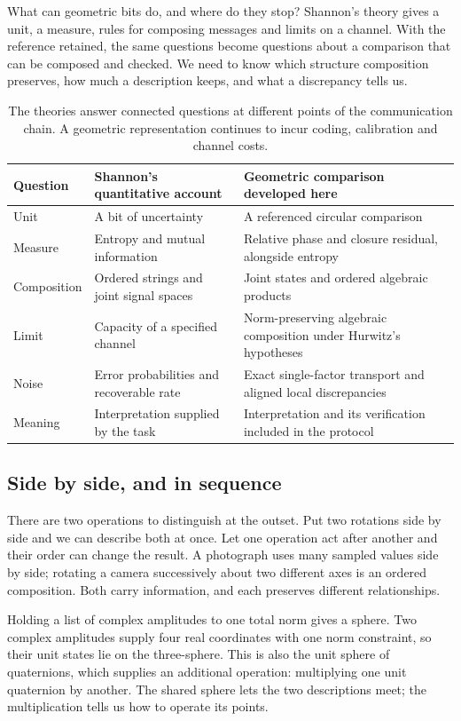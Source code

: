 \documentclass[11pt,a4paper]{article}
\begin{document}
What can geometric bits do, and where do they stop? Shannon's theory gives a
unit, a measure, rules for composing messages and limits on a channel. With
the reference retained, the same questions become questions about a comparison
that can be composed and checked. We need to know which structure composition
preserves, how much a description keeps, and what a discrepancy tells us.

\begin{table}[htbp]
\centering\small
\begin{tabularx}{\linewidth}{@{}p{22mm}XX@{}}
\toprule
Question & Shannon's quantitative account & Geometric comparison developed here\\
\midrule
Unit & A bit of uncertainty & A referenced circular comparison\\
Measure & Entropy and mutual information & Relative phase and closure residual, alongside entropy\\
Composition & Ordered strings and joint signal spaces & Joint states and ordered algebraic products\\
Limit & Capacity of a specified channel & Norm-preserving algebraic composition under Hurwitz's hypotheses\\
Noise & Error probabilities and recoverable rate & Exact single-factor transport and aligned local discrepancies\\
Meaning & Interpretation supplied by the task & Interpretation and its verification included in the protocol\\
\bottomrule
\end{tabularx}
\caption{The theories answer connected questions at different points of the
communication chain. A geometric representation continues to incur coding,
calibration and channel costs.}
\label{tab:comparison}
\end{table}

\subsection{Side by side, and in sequence}
There are two operations to distinguish at the outset. Put two rotations side
by side and we can describe both at once. Let one operation act after another
and their order can change the result. A photograph uses many sampled values
side by side; rotating a camera successively about two different axes is an
ordered composition. Both carry information, and each preserves different
relationships.

Holding a list of complex amplitudes to one total norm gives a sphere. Two
complex amplitudes supply four real coordinates with one norm constraint, so
their unit states lie on the three-sphere. This is also the unit sphere of
quaternions, which supplies an additional operation: multiplying one unit
quaternion by another. The shared sphere lets the two descriptions meet;
the multiplication tells us how to operate its points.
\end{document}
